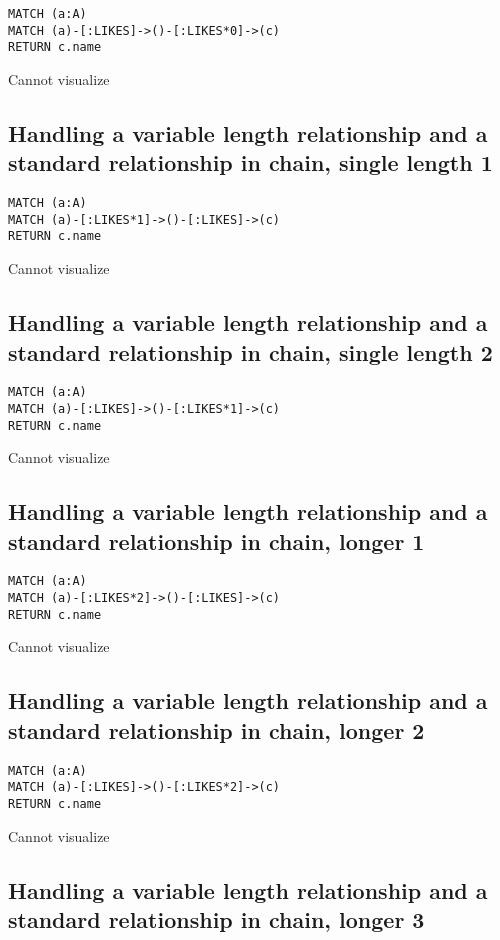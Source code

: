 \begin{lstlisting}
MATCH (a:A)
MATCH (a)-[:LIKES]->()-[:LIKES*0]->(c)
RETURN c.name
\end{lstlisting}

Cannot visualize
\subsection{Handling a variable length relationship and a standard relationship in chain, single length 1}

\begin{lstlisting}
MATCH (a:A)
MATCH (a)-[:LIKES*1]->()-[:LIKES]->(c)
RETURN c.name
\end{lstlisting}

Cannot visualize
\subsection{Handling a variable length relationship and a standard relationship in chain, single length 2}

\begin{lstlisting}
MATCH (a:A)
MATCH (a)-[:LIKES]->()-[:LIKES*1]->(c)
RETURN c.name
\end{lstlisting}

Cannot visualize
\subsection{Handling a variable length relationship and a standard relationship in chain, longer 1}

\begin{lstlisting}
MATCH (a:A)
MATCH (a)-[:LIKES*2]->()-[:LIKES]->(c)
RETURN c.name
\end{lstlisting}

Cannot visualize
\subsection{Handling a variable length relationship and a standard relationship in chain, longer 2}

\begin{lstlisting}
MATCH (a:A)
MATCH (a)-[:LIKES]->()-[:LIKES*2]->(c)
RETURN c.name
\end{lstlisting}

Cannot visualize
\subsection{Handling a variable length relationship and a standard relationship in chain, longer 3}

